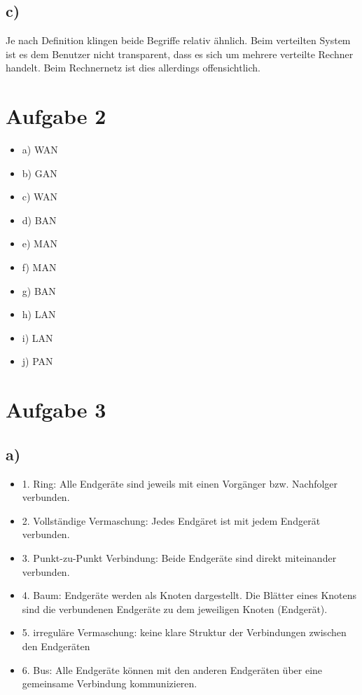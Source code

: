 \documentclass[a4paper,12pt]{scrartcl}
\begin{document}
\subsection{c)}
Je nach Definition klingen beide Begriffe relativ ähnlich. Beim verteilten
System ist es dem Benutzer nicht transparent, dass es sich um mehrere verteilte
Rechner handelt. Beim Rechnernetz ist dies allerdings offensichtlich.

\section{Aufgabe 2}
\begin{itemize}
	\item a) WAN
	\item b) GAN
	\item c) WAN
	\item d) BAN
	\item e) MAN
	\item f) MAN
	\item g) BAN
	\item h) LAN
	\item i) LAN
	\item j) PAN
\end{itemize}

\section{Aufgabe 3}
\subsection{a)}
\begin{itemize}
	\item 1. Ring: Alle Endgeräte sind jeweils mit einen Vorgänger bzw. Nachfolger verbunden.
	\item 2. Vollständige Vermaschung: Jedes Endgäret ist mit jedem Endgerät verbunden.
	\item 3. Punkt-zu-Punkt Verbindung: Beide Endgeräte sind direkt miteinander verbunden.
	\item 4. Baum: Endgeräte werden als Knoten dargestellt. Die Blätter eines Knotens sind die verbundenen Endgeräte zu dem jeweiligen Knoten (Endgerät).
	\item 5. irreguläre Vermaschung: keine klare Struktur der Verbindungen zwischen den Endgeräten
	\item 6. Bus: Alle Endgeräte können mit den anderen Endgeräten über eine gemeinsame Verbindung kommunizieren.
\end{itemize}
\end{document}
